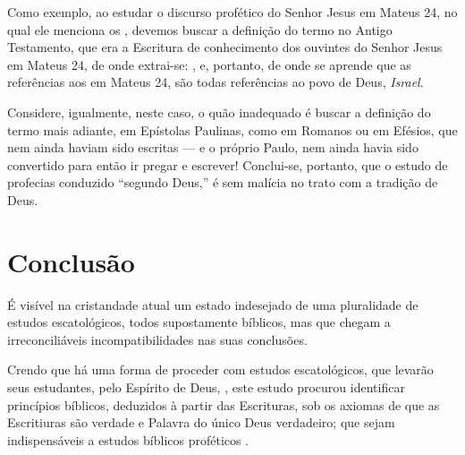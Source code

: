     Como exemplo, ao estudar o discurso profético do Senhor Jesus em Mateus 24, no qual  ele  menciona  os  ,
    devemos buscar a definição do termo no Antigo Testamento, que era a Escritura de conhecimento dos ouvintes do  Senhor  Jesus
    em Mateus 24, de onde extrai-se: , e, portanto, de onde  se  aprende  que  as  referências  aos
     em Mateus 24, são todas referências ao povo de Deus, \emph{Israel}.

    Considere, igualmente, neste caso, o quão inadequado é buscar a definição do termo mais adiante, em Epístolas Paulinas, como
    em Romanos ou em Efésios, que nem ainda haviam sido escritas --- e o próprio Paulo, nem ainda  havia  sido  convertido  para
    então ir pregar e escrever! Conclui-se, portanto, que o estudo de profecias conduzido ``segundo Deus,''  é  sem  malícia  no
    trato com a tradição de Deus.



\section{Conclusão}

    É visível na cristandade atual um estado  indesejado  de  uma  pluralidade  de  estudos  escatológicos,  todos  supostamente
    bíblicos, mas que chegam a irreconciliáveis incompatibilidades nas suas conclusões.

    Crendo que há uma forma  de proceder
    com estudos  escatológicos, que levarão seus estudantes, pelo Espírito de Deus, , este estudo
    procurou identificar princípios bíblicos, deduzidos à partir das Escrituras, sob os axiomas de que as Escritiuras são
    verdade e Palavra do único Deus verdadeiro; que sejam indispensáveis a estudos bíblicos proféticos .

